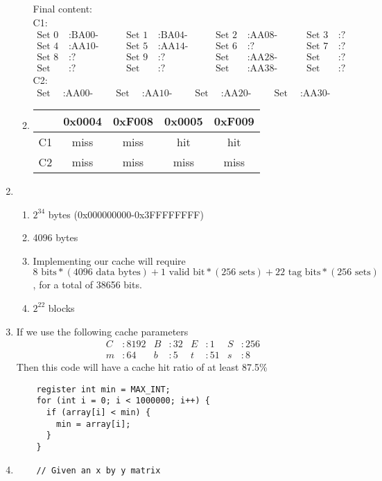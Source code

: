 \documentclass{article}
\begin{document}
\begin{enumerate}
\begin{enumerate}
        \newline
        Final content: \\
        C1: \\
        \begin{align*}
          \text{Set 0}&: \text{BA00-BA03} & \text{Set 1}&: \text{BA04-BA07} & \text{Set 2}&: \text{AA08-AA0B} & \text{Set 3}&: \text{?} \\
          \text{Set 4}&: \text{AA10-AA13} & \text{Set 5}&: \text{AA14-AA17} & \text{Set 6}&: \text{?} & \text{Set 7}&: \text{?} \\
          \text{Set 8}&: \text{?} & \text{Set 9}&: \text{?} & \text{Set 10}&: \text{AA28-AA2B} & \text{Set 11}&: \text{?} \\
          \text{Set 12}&: \text{?} & \text{Set 13}&: \text{?} & \text{Set 14}&: \text{AA38-AA3B} & \text{Set 15}&: \text{?}
        \end{align*}
        C2: \\
        \begin{align*}
          \text{Set 0}&: \text{AA00-AA0F} & \text{Set 1}&: \text{AA10-AA1F} & \text{Set 2}&: \text{AA20-AA2F} & \text{Set 3}&: \text{AA30-AA3F}
        \end{align*}
        \item
        \begin{tabular}{l|c|c|c|c}
           & 0x0004 & 0xF008 & 0x0005 & 0xF009\\ \hline
          C1 & miss & miss & hit & hit\\ \hline
          C2 & miss & miss & miss & miss
        \end{tabular}
      \end{enumerate}
    \item
    \begin{enumerate}
      \item $2^{34}$ bytes (0x000000000-0x3FFFFFFFF)
      \item 4096 bytes
      \item Implementing our cache will require
      $8 \text{ bits}*(4096 \text{ data bytes}) + 1 \text{ valid bit}*(256 \text{ sets}) + 22 \text{ tag bits}*(256 \text{ sets})$,
      for a total of 38656 bits.
      \item $2^{22}$ blocks
    \end{enumerate}
    \item If we use the following cache parameters
    \begin{align*}
      C&: 8192 & B&: 32 & E&: 1 & S&: 256 \\
      m&: 64 & b&: 5 & t&: 51 & s&: 8
    \end{align*}
    Then this code will have a cache hit ratio of at least 87.5\%
    \begin{verbatim}
    register int min = MAX_INT;
    for (int i = 0; i < 1000000; i++) {
      if (array[i] < min) {
        min = array[i];
      }
    }
    \end{verbatim}
    \item
    \begin{verbatim}
    // Given an x by y matrix


\end{verbatim}
\end{enumerate}
\end{document}
